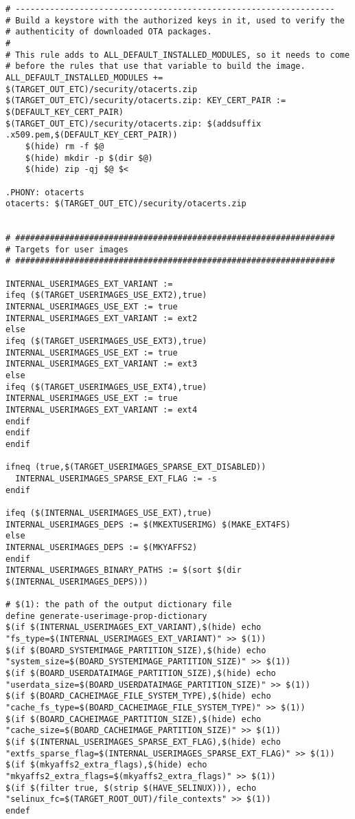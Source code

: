 \documentclass[12pt,a4paper]{article}
\begin{document}
\begin{verbatim}
# -----------------------------------------------------------------
# Build a keystore with the authorized keys in it, used to verify the
# authenticity of downloaded OTA packages.
#
# This rule adds to ALL_DEFAULT_INSTALLED_MODULES, so it needs to come
# before the rules that use that variable to build the image.
ALL_DEFAULT_INSTALLED_MODULES += $(TARGET_OUT_ETC)/security/otacerts.zip
$(TARGET_OUT_ETC)/security/otacerts.zip: KEY_CERT_PAIR := $(DEFAULT_KEY_CERT_PAIR)
$(TARGET_OUT_ETC)/security/otacerts.zip: $(addsuffix .x509.pem,$(DEFAULT_KEY_CERT_PAIR))
	$(hide) rm -f $@
	$(hide) mkdir -p $(dir $@)
	$(hide) zip -qj $@ $<

.PHONY: otacerts
otacerts: $(TARGET_OUT_ETC)/security/otacerts.zip


# #################################################################
# Targets for user images
# #################################################################

INTERNAL_USERIMAGES_EXT_VARIANT :=
ifeq ($(TARGET_USERIMAGES_USE_EXT2),true)
INTERNAL_USERIMAGES_USE_EXT := true
INTERNAL_USERIMAGES_EXT_VARIANT := ext2
else
ifeq ($(TARGET_USERIMAGES_USE_EXT3),true)
INTERNAL_USERIMAGES_USE_EXT := true
INTERNAL_USERIMAGES_EXT_VARIANT := ext3
else
ifeq ($(TARGET_USERIMAGES_USE_EXT4),true)
INTERNAL_USERIMAGES_USE_EXT := true
INTERNAL_USERIMAGES_EXT_VARIANT := ext4
endif
endif
endif

ifneq (true,$(TARGET_USERIMAGES_SPARSE_EXT_DISABLED))
  INTERNAL_USERIMAGES_SPARSE_EXT_FLAG := -s
endif

ifeq ($(INTERNAL_USERIMAGES_USE_EXT),true)
INTERNAL_USERIMAGES_DEPS := $(MKEXTUSERIMG) $(MAKE_EXT4FS)
else
INTERNAL_USERIMAGES_DEPS := $(MKYAFFS2)
endif
INTERNAL_USERIMAGES_BINARY_PATHS := $(sort $(dir $(INTERNAL_USERIMAGES_DEPS)))

# $(1): the path of the output dictionary file
define generate-userimage-prop-dictionary
$(if $(INTERNAL_USERIMAGES_EXT_VARIANT),$(hide) echo "fs_type=$(INTERNAL_USERIMAGES_EXT_VARIANT)" >> $(1))
$(if $(BOARD_SYSTEMIMAGE_PARTITION_SIZE),$(hide) echo "system_size=$(BOARD_SYSTEMIMAGE_PARTITION_SIZE)" >> $(1))
$(if $(BOARD_USERDATAIMAGE_PARTITION_SIZE),$(hide) echo "userdata_size=$(BOARD_USERDATAIMAGE_PARTITION_SIZE)" >> $(1))
$(if $(BOARD_CACHEIMAGE_FILE_SYSTEM_TYPE),$(hide) echo "cache_fs_type=$(BOARD_CACHEIMAGE_FILE_SYSTEM_TYPE)" >> $(1))
$(if $(BOARD_CACHEIMAGE_PARTITION_SIZE),$(hide) echo "cache_size=$(BOARD_CACHEIMAGE_PARTITION_SIZE)" >> $(1))
$(if $(INTERNAL_USERIMAGES_SPARSE_EXT_FLAG),$(hide) echo "extfs_sparse_flag=$(INTERNAL_USERIMAGES_SPARSE_EXT_FLAG)" >> $(1))
$(if $(mkyaffs2_extra_flags),$(hide) echo "mkyaffs2_extra_flags=$(mkyaffs2_extra_flags)" >> $(1))
$(if $(filter true, $(strip $(HAVE_SELINUX))), echo "selinux_fc=$(TARGET_ROOT_OUT)/file_contexts" >> $(1))
endef


\end{verbatim}
\end{document}
